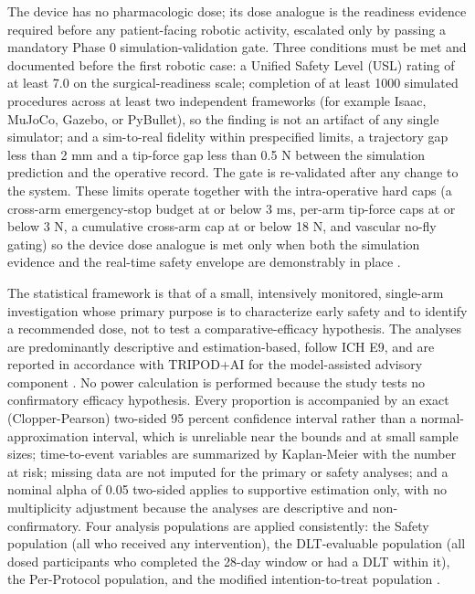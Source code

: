 The device has no pharmacologic dose; its dose analogue is the readiness evidence
required before any patient-facing robotic activity, escalated only by passing a
mandatory Phase 0 simulation-validation gate. Three conditions must be met and
documented before the first robotic case: a Unified Safety Level (USL) rating of at
least 7.0 on the surgical-readiness scale; completion of at least 1000 simulated
procedures across at least two independent frameworks (for example Isaac, MuJoCo,
Gazebo, or PyBullet), so the finding is not an artifact of any single simulator; and
a sim-to-real fidelity within prespecified limits, a trajectory gap less than 2 mm
and a tip-force gap less than 0.5 N between the simulation prediction and the
operative record. The gate is re-validated after any change to the system. These
limits operate together with the intra-operative hard caps (a cross-arm
emergency-stop budget at or below 3 ms, per-arm tip-force caps at or below 3 N, a
cumulative cross-arm cap at or below 18 N, and vascular no-fly gating) so the device
dose analogue is met only when both the simulation evidence and the real-time safety
envelope are demonstrably in place \cite{onpremwhippl,daraxwhipple}.

The statistical framework is that of a small, intensively monitored, single-arm
investigation whose primary purpose is to characterize early safety and to identify
a recommended dose, not to test a comparative-efficacy hypothesis. The analyses are
predominantly descriptive and estimation-based, follow ICH E9, and are reported in
accordance with TRIPOD+AI for the model-assisted advisory component
\cite{ichpaistduni}. No power calculation is performed because the study tests no
confirmatory efficacy hypothesis. Every proportion is accompanied by an exact
(Clopper-Pearson) two-sided 95 percent confidence interval rather than a
normal-approximation interval, which is unreliable near the bounds and at small
sample sizes; time-to-event variables are summarized by Kaplan-Meier with the number
at risk; missing data are not imputed for the primary or safety analyses; and a
nominal alpha of 0.05 two-sided applies to supportive estimation only, with no
multiplicity adjustment because the analyses are descriptive and non-confirmatory.
Four analysis populations are applied consistently: the Safety population (all who
received any intervention), the DLT-evaluable population (all dosed participants who
completed the 28-day window or had a DLT within it), the Per-Protocol population,
and the modified intention-to-treat population \cite{ichpaistduni,phase1guidance}.

